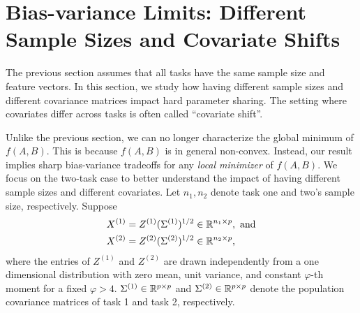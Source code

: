 \section{Bias-variance Limits: Different Sample Sizes and Covariate Shifts}\label{sec_diff}

The previous section assumes that all tasks have the same sample size and feature vectors.
In this section, we study how having different sample sizes and different covariance matrices impact hard parameter sharing.
The setting where covariates differ across tasks is often called ``covariate shift''.

Unlike the previous section, we can no longer characterize the global minimum of $f(A, B)$.
This is because $f(A, B)$ is in general non-convex.
Instead, our result implies sharp bias-variance tradeoffs for any \emph{local minimizer} of $f(A, B)$.
We focus on the two-task case to better understand the impact of having different sample sizes and different covariates.
Let $n_1, n_2$ denote task one  and two's sample size, respectively.
Suppose
\begin{align*}
	X^{(1)} &= Z^{(1)}(\Sigma^{(1)})^{1/2} \in \mathbb{R}^{n_1 \times p}, \text{ and} \\
	X^{(2)} &= Z^{(2)}(\Sigma^{(2)})^{1/2} \in \mathbb{R}^{n_2 \times p},
\end{align*}
where the entries of $Z^{(1)}$ and $ Z^{(2)}$ are drawn independently from a one dimensional distribution with zero mean, unit variance, and constant $\varphi$-th moment for a fixed $\varphi > 4$. $\Sigma^{(1)}\in \mathbb{R}^{p\times p}$ and $\Sigma^{(2)}\in \mathbb{R}^{p\times p}$ denote the population covariance matrices of task 1 and task 2, respectively.

